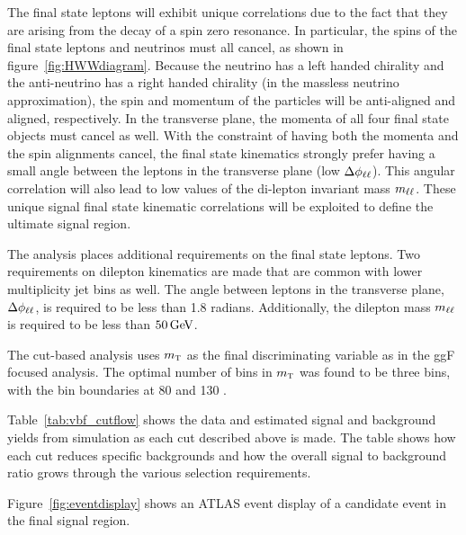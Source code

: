The final state leptons will exhibit unique correlations due to the fact that they are arising from the decay of a spin zero resonance. In particular, the spins of the final state leptons and neutrinos must all cancel, as shown in figure~\ref{fig:HWWdiagram}. Because the neutrino has a left handed
chirality and the anti-neutrino has a right handed chirality (in the massless neutrino approximation), the spin and momentum of the particles will be anti-aligned and aligned, respectively. In the transverse plane, the momenta of all four final state objects must cancel as well. With the constraint of having both the momenta and the spin alignments cancel, the final state kinematics strongly prefer having a small angle between the leptons in the transverse plane (low $\Delta\phi_{\ell\ell}$). This angular correlation will also lead to low values of the di-lepton invariant mass $m_{\ell\ell}$. These unique signal final state kinematic correlations will be exploited to define the ultimate signal region. 

The analysis places additional requirements on the final state leptons. Two requirements on dilepton kinematics are made that are common with lower multiplicity jet bins as well. The angle between leptons in the transverse plane, $\Delta\phi_{\ell\ell}$, is required to be less than 1.8 radians. Additionally, the dilepton mass $m_{\ell\ell}$ is required to be less than $50 \GeV$. 

The cut-based analysis uses $m_{\textrm{\footnotesize\sc t}}$ as the final discriminating variable as in the ggF focused analysis. The optimal number of bins in $m_{\textrm{\footnotesize\sc t}}$ was found to be three bins, with the bin boundaries at 80 and 130 \GeV. 

Table~\ref{tab:vbf_cutflow} shows the data and estimated signal and background yields from simulation as each cut described above is made. The table shows how each cut reduces specific backgrounds and how the overall signal to background ratio grows through the various selection requirements. 

Figure~\ref{fig:eventdisplay} shows an ATLAS event display of a candidate event in the final signal region. 

